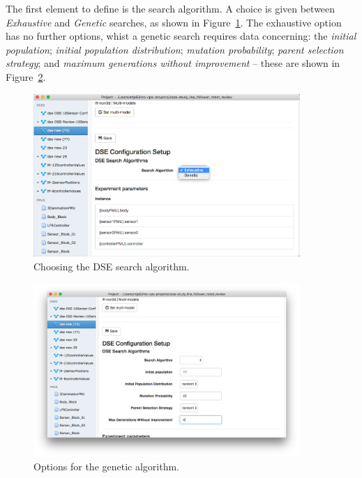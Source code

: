The first element to define is the search algorithm. A choice is given between \textit{Exhaustive} and \textit{Genetic} searches, as shown in Figure~\ref{fig:dse:edit:app-algorithm-choice}. The exhaustive option has no further options, whist a genetic search requires data concerning: the \textit{initial population}; \textit{initial population distribution}; \textit{mutation probability}; \textit{parent selection strategy}; and \textit{maximum generations without improvement} -- these are shown in Figure~\ref{fig:dse:edit:app-algorithm-genetic}.
%
%
\begin{figure}[ht]
	\centering
	\includegraphics[width=0.9\textwidth]{figures/dse/app-algorithm-choice}
	\caption{Choosing the DSE search algorithm.}\label{fig:dse:edit:app-algorithm-choice}
\end{figure}
%
%
\begin{figure}[ht]
	\centering
	\includegraphics[width=0.9\textwidth]{figures/dse/app-algorithm-genetic}
	\caption{Options for the genetic algorithm.}\label{fig:dse:edit:app-algorithm-genetic}
\end{figure}

